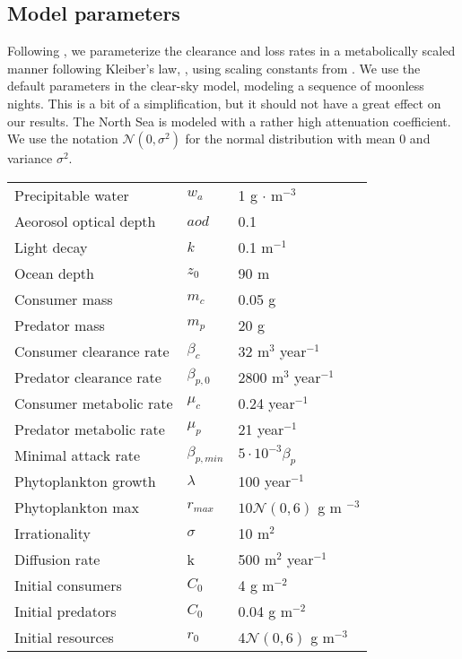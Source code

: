 \subsection{Model parameters}
Following \citep{yodzis1992body}, we parameterize the clearance and loss rates in a metabolically scaled manner following Kleiber's law, \citep{yodzis1992body}, using scaling constants from \citep{kha_2019}. We use the default parameters in the clear-sky model, modeling a sequence of moonless nights. This is a bit of a simplification, but it should not have a great effect on our results. The North Sea is modeled with a rather high attenuation coefficient. We use the notation $\mathcal{N}(0,\sigma^2)$ for the normal distribution with mean $0$ and variance $\sigma^2$.


\begin{tabular}{l  l  l}
  Precipitable water & $w_a$ & 1 g $\cdot$ m$^{-3}$\\
  Aeorosol optical depth & $aod$ & 0.1 \\
  Light decay & $k$ & 0.1 m$^{-1}$\\
  Ocean depth & $z_0$ & 90 m \\
  Consumer mass & $m_c$ & 0.05 g \\
  Predator mass & $m_p$ & 20 g \\
  Consumer clearance rate & $\beta_c$ & 32 m$^{3}$ year$^{-1}$ \\
  Predator clearance rate & $\beta_{p,0}$ & 2800 m$^3$ year$^{-1}$ \\
  Consumer metabolic rate & $\mu_c$ & 0.24 year$^{-1}$ \\
  Predator metabolic rate & $\mu_p$ & 21 year$^{-1}$ \\
  Minimal attack rate & $\beta_{p,min}$ & $5 \cdot 10^{-3} \beta_p$ \\
  Phytoplankton growth & $\lambda$ & 100 year$^{-1}$ \\
  Phytoplankton max & $r_{max}$ & $10\mathcal{N}(0,6)$ g m $^{-3}$ \\
  Irrationality & $\sigma$ & 10 m$^2$ \\
  Diffusion rate & k & 500 m$^{2}$ year$^{-1}$ \\
  Initial consumers & $C_0$ & 4  g m$^{-2}$ \\
  Initial predators & $C_0$ & 0.04  g m$^{-2}$ \\
  Initial resources & $r_0$ & 4$\mathcal{N}(0,6)$ g m$^{-3}$
\end{tabular}

